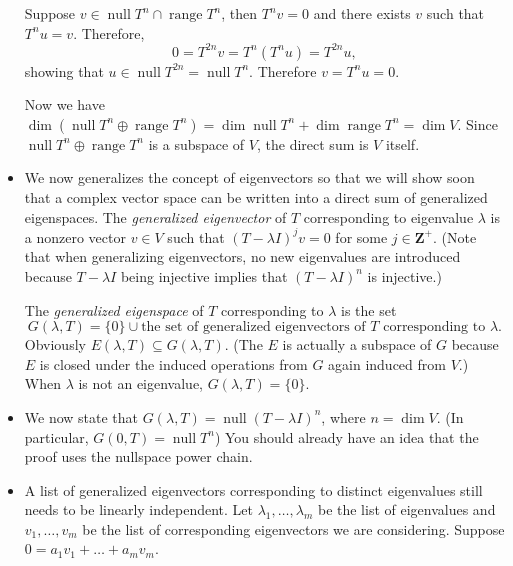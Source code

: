 \documentclass[11pt]{article}
\newcommand{\df}[1]{\textit{\textsf{#1}}}
\newcommand{\Z}{\mathbf{Z}}
\newcommand{\n}{\operatorname{null}}
\renewcommand{\r}{\operatorname{range}}
\renewcommand{\d}{\dim}
\begin{document}
\begin{itemize}
    Suppose $v \in \n T^n \cap \r T^n$, then $T^n v= 0$ and there exists $v$ such that $T^n u=v$. Therefore, $$0 = T^{2n} v = T^n (T^n u) = T^{2n} u,$$ showing that $u \in \n T^{2n} = \n T^n$. Therefore $v = T^n u = 0$.
    
    Now we have $\d (\n T^n \oplus \r T^n) = \d\n T^n + \d\r T^n = \d V$. Since $\n T^n \oplus \r T^n$ is a subspace of $V$, the direct sum is $V$ itself.
    \item We now generalizes the concept of eigenvectors so that we will show soon that a complex vector space can be written into a direct sum of generalized eigenspaces. The \df{generalized eigenvector} of $T$ corresponding to eigenvalue $\lambda$ is a nonzero vector $v \in V$ such that $(T-\lambda I)^j v = 0$ for some $j \in \Z^+$. (Note that when generalizing eigenvectors, no new eigenvalues are introduced because $T - \lambda I$ being injective implies that $(T -\lambda I)^n$ is injective.)
    
    The \df{generalized eigenspace} of $T$ corresponding to $\lambda$ is the set $$G(\lambda, T) = \{0\} \cup \text{the set of generalized eigenvectors of $T$ corresponding to $\lambda$}.$$
    Obviously $E(\lambda, T) \subseteq G(\lambda, T)$. (The $E$ is actually a subspace of $G$ because $E$ is closed under the induced operations from $G$ again induced from $V$.) When $\lambda$ is not an eigenvalue, $G(\lambda, T) = \{0\}$.
    \item We now state that $G(\lambda, T) = \n (T - \lambda I)^n$, where $n = \d V$. (In particular, $G(0,T) = \n T^n$) You should already have an idea that the proof uses the nullspace power chain.
    \item A list of generalized eigenvectors corresponding to distinct eigenvalues still needs to be linearly independent. Let $\lambda_1,\dots,\lambda_m$ be the list of eigenvalues and $v_1,\dots,v_m$ be the list of corresponding eigenvectors we are considering. Suppose $0 = a_1v_1 + \dots + a_mv_m$.
    

\end{itemize}
\end{document}

